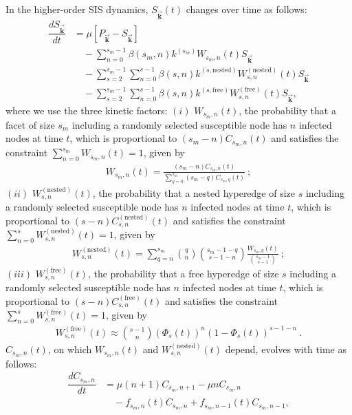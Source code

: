 \documentclass[aps,pre,twocolumn,nofootinbib,superscriptaddress,showpacs,showkeys]{revtex4-1}
\begin{document}
In the higher-order SIS dynamics, 
$S_{\vec{\mathbf{k}}}(t)$ changes over time as follows:
\begin{align}
\dfrac{dS_{\vec{\mathbf{k}}}}{dt} &=\mu\left[P_{\vec{\mathbf{k}}}-S_{\vec{\mathbf{k}}}\right]\nonumber
\\
&\quad
-\sum\limits_{n=0}^{s_{m}-1} \beta(s_{m},n)k^{(s_m)}W_{s_m,n}(t)S_{\vec{\mathbf{k}}}
\nonumber\\
&\quad
-\sum\limits_{s=2}^{s_{m}-1} \sum\limits_{n=0}^{s-1} \beta(s,n) k^{(s,\mathrm{nested})}W^{(\mathrm{nested})}_{s,n}(t)S_{\vec{\mathbf{k}}}\nonumber
\\
&\quad-\sum\limits_{s=2}^{s_{m}-1} \sum\limits_{n=0}^{s-1} \beta(s,n) k^{(s,\mathrm{free})}W^{(\mathrm{free})}_{s,n}(t)
S_{\vec{\mathbf{k}}},
\label{eq:eq1}
\end{align}
where we use the three kinetic factors: 
$(i)$
$W_{s_{m},n}(t)$, the probability that a facet of size $s_m$ including a randomly selected susceptible node has $n$ infected nodes at time $t$, which is proportional to $(s_m-n)C_{s_m,n}(t)$ and satisfies the constraint $\sum_{n=0}^{s_m} W_{s_m,n}(t)=1$, given by
\begin{align}
W_{s_{m},n}(t)=\frac{(s_m-n)C_{s_m,n}(t)}{\sum_{q=0}^{s_m} (s_m-q)C_{s_m,q}(t)}~;
\label{eq:kinefac}
\end{align}
$(ii)$
$W^{(\mathrm{nested})}_{s,n}(t)$, the probability that a nested hyperedge of size $s$ including a randomly selected  susceptible node has $n$ infected nodes at time $t$, which is proportional to $(s-n)C^{(\mathrm{nested})}_{s,n}(t)$ and satisfies the constraint $\sum_{n=0}^{s} W^{(\mathrm{nested})}_{s,n}(t)=1$, given by
\begin{align}
W^{(\mathrm{nested})}_{s,n}(t)=\sum_{q=n}^{s_m} {q \choose n}{s_m-1-q \choose s-1-n}\frac{W_{s_m,q}(t)}{{s_m-1 \choose s-1}}~;
\end{align}
$(iii)$
$W^{(\mathrm{free})}_{s,n}(t)$, the probability that a free hyperedge of size $s$ including a randomly selected susceptible node has $n$ infected nodes at time $t$, which is proportional to $(s-n)C^{(\mathrm{free})}_{s,n}(t)$ and satisfies the constraint $\sum_{n=0}^{s} W^{(\mathrm{free})}_{s,n}(t)=1$, given by
\begin{align}
W^{(\mathrm{free})}_{s,n}(t)\approx\binom{s-1}{n}(\Phi_s(t))^n (1-\Phi_s(t))^{s-1-n}~.
\end{align}
$C_{s_m,n}(t)$, on which $W_{s_m,n}(t)$ and $W^{(\mathrm{nested})}_{s,n}(t)$ depend, evolves with time as follows:
\begin{align}
\dfrac{dC_{s_{m},n}}{dt} &= \mu(n+1)C_{s_{m},n+1}-{\mu}nC_{s_{m},n}\nonumber
\\
&\quad-f_{s_{m},n}(t)C_{s_{m},n}+f_{s_{m},n-1}(t)C_{s_{m},n-1},
\label{eq:eq2}
\end{align}
\end{document}
